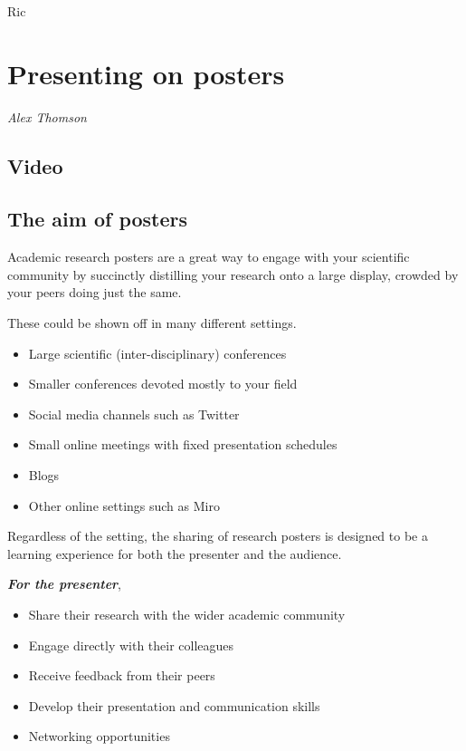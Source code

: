\documentclass[
]{book}
\providecommand{\tightlist}{%
  \setlength{\itemsep}{0pt}\setlength{\parskip}{0pt}}
\begin{document}
Ric

\hypertarget{posters}{%
\chapter{Presenting on posters}\label{posters}}

\emph{Alex Thomson}

\hypertarget{video}{%
\section{Video}\label{video}}

\hypertarget{the-aim-of-posters}{%
\section{The aim of posters}\label{the-aim-of-posters}}

Academic research posters are a great way to engage with your scientific community by succinctly distilling your research onto a large display, crowded by your peers doing just the same.

These could be shown off in many different settings.

\begin{itemize}
\tightlist
\item
  Large scientific (inter-disciplinary) conferences
\item
  Smaller conferences devoted mostly to your field
\item
  Social media channels such as Twitter
\item
  Small online meetings with fixed presentation schedules
\item
  Blogs
\item
  Other online settings such as Miro
\end{itemize}

Regardless of the setting, the sharing of research posters is designed to be a learning experience for both the presenter and the audience.

\textbf{\emph{For the presenter}},

\begin{itemize}
\tightlist
\item
  Share their research with the wider academic community
\item
  Engage directly with their colleagues
\item
  Receive feedback from their peers
\item
  Develop their presentation and communication skills
\item
  Networking opportunities
\end{itemize}
\end{document}
